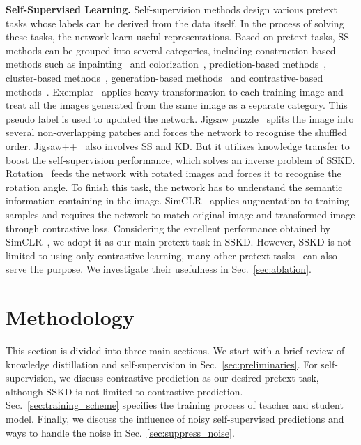 \documentclass[runningheads]{llncs}
\begin{document}
\noindent
{\bf Self-Supervised Learning.} 
Self-supervision methods design various pretext tasks whose labels can be derived from the data itself. In the process of solving these tasks, the network learn useful representations.
Based on pretext tasks, SS methods can be grouped into several categories, including construction-based methods such as inpainting~\cite{inpainting} and colorization~\cite{color}, prediction-based methods~\cite{relative_pos,exemplar,rot,rot2,shuffle,jigsaw,jigsawpp,cmp,aet}, cluster-based methods~\cite{deepcluster,odc}, generation-based methods~\cite{bigbigan,bigan,GAN} and contrastive-based methods~\cite{SimCLR,cpcpp,PIRL,cpc,cmc}. 
Exemplar~\cite{exemplar} applies heavy transformation to each training image and treat all the images generated from the same image as a separate category. This pseudo label is used to updated the network. Jigsaw puzzle~\cite{jigsaw} splits the image into several non-overlapping patches and forces the network to recognise the shuffled order. Jigsaw++~\cite{jigsawpp} also involves SS and KD. But it utilizes knowledge transfer to boost the self-supervision performance, which solves an inverse problem of SSKD. Rotation~\cite{rot2} feeds the network with rotated images and forces it to recognise the rotation angle. To finish this task, the network has to understand the semantic information containing in the image. SimCLR~\cite{SimCLR} applies augmentation to training samples and requires the network to match original image and transformed image through contrastive loss.
Considering the excellent performance obtained by SimCLR~\cite{SimCLR}, we adopt it as our main pretext task in SSKD. However, SSKD is not limited to using only contrastive learning, many other pretext tasks~\cite{exemplar,rot2,jigsaw} can also serve the purpose. We investigate their usefulness in Sec.~\ref{sec:ablation}.
 


\section{Methodology}


This section is divided into three main sections.
We start with a brief review of knowledge distillation and self-supervision in Sec.~\ref{sec:preliminaries}. For self-supervision, we discuss contrastive prediction as our desired pretext task, although SSKD is not limited to contrastive prediction.
Sec.~\ref{sec:training_scheme} specifies the training process of teacher and student model. Finally, we discuss the influence of noisy self-supervised predictions and ways to handle the noise in Sec.~\ref{sec:suppress_noise}.
\end{document}
